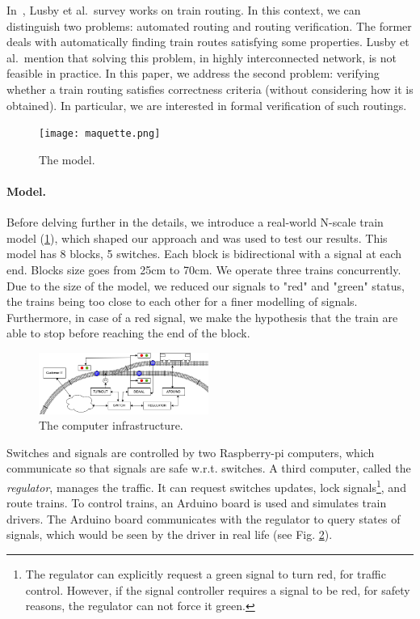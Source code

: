 \documentclass[runningheads]{llncs}
\begin{document}
In~\cite{lusby_railway_2011}, Lusby et al.\ survey works on train routing. In this context, we can distinguish two problems: automated routing and routing verification. The former deals with automatically finding train routes satisfying some properties. Lusby et al.\ mention that solving this problem, in highly interconnected network, is not feasible in practice. In this paper, we address the second problem: verifying whether a train routing satisfies correctness criteria (without considering how it is obtained). In particular, we are interested in formal verification of such routings.

\begin{figure}
	\begin{minipage}{0.28\textwidth}
		\centering
		\vspace{-8mm}
		\texttt{[image: maquette.png]}
		\caption{The model.}
		\label{fig:maquette}
	\end{minipage}
\end{figure}

\paragraph{Model.}
Before delving further in the details, we introduce a real-world N-scale train model (\ref{fig:maquette}), which shaped our approach and was used to test our results. This model has 8 blocks, 5 switches. Each block is bidirectional with a signal at each end. Blocks size goes from 25cm to 70cm. We operate three trains concurrently. Due to the size of the model, we reduced our signals  to "red" and "green" status, the trains being too close to each other for a finer modelling of signals. Furthermore, in case of a red signal, we make the hypothesis that the train are able to stop before reaching the end of the block.

\begin{figure}
	\vspace{-6mm}
	\includegraphics[height=20mm]{TrainSchema.png}
	\caption{The computer infrastructure.}
	\label{fig:computers}
\end{figure}

Switches and signals are controlled by two Raspberry-pi computers, which communicate so that signals are safe w.r.t. switches. A third computer, called the \emph{regulator}, manages the traffic. It can request switches updates, lock signals\footnote{The regulator can explicitly request a green signal to turn red, for traffic control. However, if the signal controller requires a signal to be red, for safety reasons, the regulator can not force it green.}, and route trains. To control trains, an Arduino board is used and simulates train drivers. The Arduino board communicates with the regulator to query states of signals, which would be seen by the driver in real life (see Fig. \ref{fig:computers}). 
\end{document}
